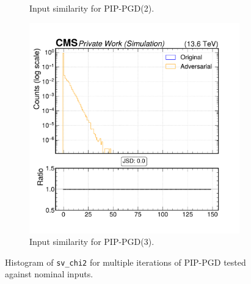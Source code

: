 \begin{figure}[htbp]
\begin{subfigure}[t]{0.32\textwidth}
    \caption*{Input similarity for PIP-PGD(2).}
  \end{subfigure}\hfill
  \begin{subfigure}[t]{0.32\textwidth}
    \includegraphics[width=\linewidth]{media/output/features/compare/combined_it_3/cmp_vtx_arr_sv_chi2.pdf}
    \caption*{Input similarity for PIP-PGD(3).}
  \end{subfigure}

  \caption*{Histogram of \texttt{sv\_chi2} for multiple iterations of PIP-PGD tested against nominal inputs.}
  \label{fig:combined_input_sv_chi2}
\end{figure}

